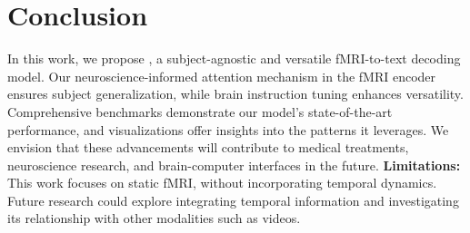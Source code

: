 \section{Conclusion}
In this work, we propose \mindllm{}, a subject-agnostic and versatile fMRI-to-text decoding model. Our neuroscience-informed attention mechanism in the fMRI encoder ensures subject generalization, while brain instruction tuning enhances versatility. Comprehensive benchmarks demonstrate our model's state-of-the-art performance, and visualizations offer insights into the patterns it leverages. We envision that these advancements will contribute to medical treatments, neuroscience research, and brain-computer interfaces in the future. \noindent\textbf{Limitations:} This work focuses on static fMRI, without incorporating temporal dynamics. Future research could explore integrating temporal information and investigating its relationship with other modalities such as videos.%